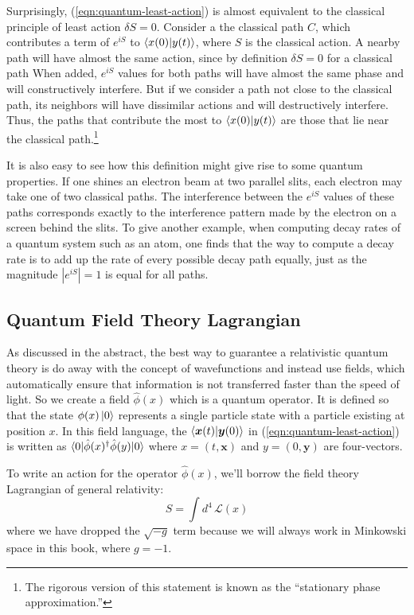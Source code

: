 Surprisingly, (\ref{eqn:quantum-least-action}) is almost equivalent to the classical principle of least action $\delta S = 0$. Consider a the classical path $C$, which contributes a term of $e^{iS}$ to $\braket{x(0)|y(t)}$, where $S$ is the classical action. A nearby path will have almost the same action, since by definition $\delta S = 0$ for a classical path When added, $e^{iS}$ values for both paths will have almost the same phase and will constructively interfere. But if we consider a path not close to the classical path, its neighbors will have dissimilar actions and will destructively interfere. Thus, the paths that contribute the most to $\braket{x(0)|y(t)}$ are those that lie near the classical path.\footnote{The rigorous version of this statement is known as the ``stationary phase approximation.''}

It is also easy to see how this definition might give rise to some quantum properties. If one shines an electron beam at two parallel slits, each electron may take one of two classical paths. The interference between the $e^{iS}$ values of these paths corresponds exactly to the interference pattern made by the electron on a screen behind the slits. To give another example, when computing decay rates of a quantum system such as an atom, one finds that the way to compute a decay rate is to add up the rate of every possible decay path equally, just as the magnitude $|e^{iS}|=1$ is equal for all paths.

\subsection{Quantum Field Theory Lagrangian}
As discussed in the abstract, the best way to guarantee a relativistic quantum theory is do away with the concept of wavefunctions and instead use fields, which automatically ensure that information is not transferred faster than the speed of light. So we create a field $\hat \phi(x)$ which is a quantum operator. It is defined so that the state $\phi(x)\ket{0}$ represents a single particle state with a particle existing at position $x$. In this field language, the $\braket{\bm x(t)|\bm y(0)}$ in (\ref{eqn:quantum-least-action}) is written as $\braket{0|\hat\phi(x)^\dagger \hat\phi(y)|0}$ where $x = (t,\bm x)$ and $y=(0, \bm y)$ are four-vectors.

To write an action for the operator $\hat \phi(x)$, we'll borrow the field theory Lagrangian of general relativity:
\begin{equation}
  S = \int d^4\, \mathcal{L}(x)
\end{equation}
where we have dropped the $\sqrt{-g}$ term because we will always work in Minkowski space in this book, where $g= -1$.

